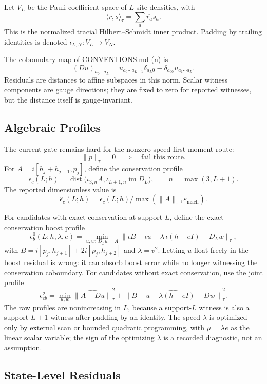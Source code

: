 Let \(V_L\) be the Pauli coefficient space of \(L\)-site densities, with
\[
  \langle r,s\rangle_\tau=\sum_a\overline{r_a}s_a.
\]
This is the normalized tracial Hilbert--Schmidt inner product.  Padding by
trailing identities is denoted \(\iota_{L,N}:V_L\to V_N\).

The coboundary map of CONVENTIONS.md (n) is
\[
  (Du)_{a_0\cdots a_L}
  =u_{a_0\cdots a_{L-1}}\delta_{a_L0}
   -\delta_{a_00}u_{a_1\cdots a_L}.
\]
Residuals are distances to affine subspaces in this norm.  Scalar witness
components are gauge directions; they are fixed to zero for reported witnesses,
but the distance itself is gauge-invariant.

\subsection{Algebraic Profiles}

The current gate remains hard for the nonzero-speed first-moment route:
\[
  \|p\|_\tau=0 \quad\Longrightarrow\quad \text{fail this route}.
\]
For \(A=i[h_j+h_{j+1},p_j]\), define the conservation profile
\[
  \epsilon_c(L;h)
  =
  \operatorname{dist}\bigl(\iota_{3,n}A,
  \iota_{L+1,n}\operatorname{im}D_L\bigr),
  \qquad n=\max(3,L+1).
\]
The reported dimensionless value is
\[
  \widehat\epsilon_c(L;h)
  =
  \epsilon_c(L;h)/\max(\|A\|_\tau,\varepsilon_{\mathrm{mach}}).
\]

For candidates with exact conservation at support \(L\), define the
exact-conservation boost profile
\[
  \epsilon_b^0(L;h,\lambda,e)
  =\min_{u,w:\,D_Lu=A}
  \|\iota B-\iota u-\lambda\,\iota(h-eI)-D_Lw\|_\tau ,
\]
with \(B=i[p_j,h_{j+1}]+2i[p_j,h_{j+2}]\) and \(\lambda=v^2\).  Letting \(u\)
float freely in the boost residual is wrong: it can absorb boost error while no
longer witnessing the conservation coboundary.  For candidates without exact
conservation, use the joint profile
\[
  \epsilon_{cb}^2
  =
  \min_{u,w}
  \widehat{\|A-Du\|}_\tau^2
  +
  \widehat{\|B-u-\lambda(h-eI)-Dw\|}_\tau^2 .
\]
The raw profiles are nonincreasing in \(L\), because a support-\(L\) witness is
also a support-\(L+1\) witness after padding by an identity.  The speed
\(\lambda\) is optimized only by external scan or bounded quadratic
programming, with \(\mu=\lambda e\) as the linear scalar variable; the sign of
the optimizing \(\lambda\) is a recorded diagnostic, not an assumption.

\subsection{State-Level Residuals}

